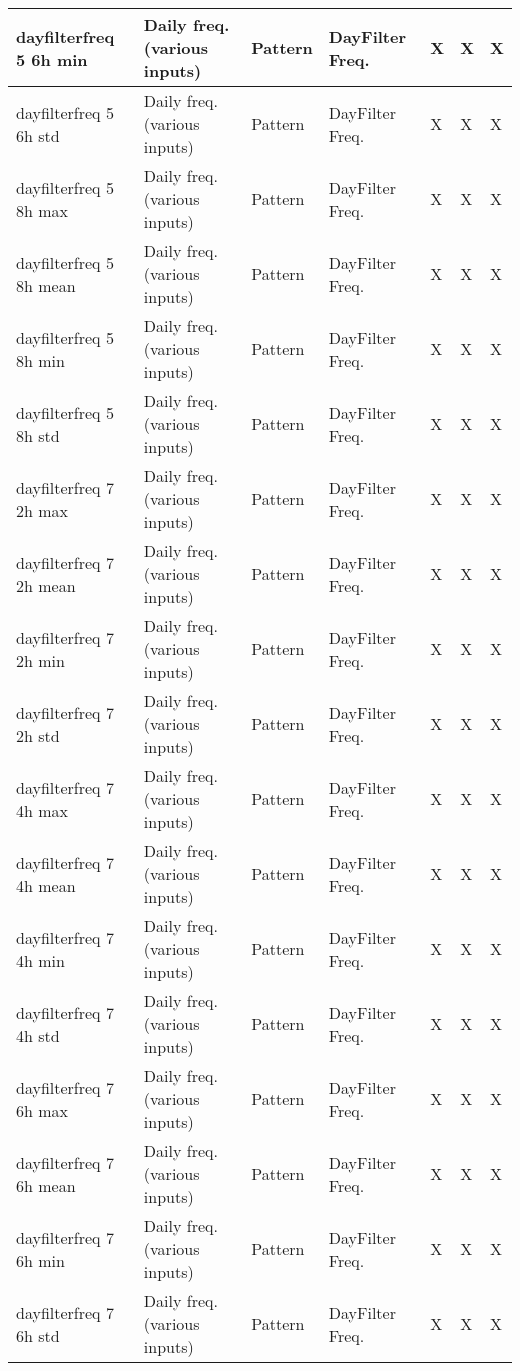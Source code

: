 {{\begin{longtable}[l]{ | p{4cm} | p{4cm} | p{1cm} | p{2cm} | p{0.3cm} | p{0.3cm} | p{0.3cm} |}
	 dayfilterfreq 5 6h min & Daily freq. (various inputs) & Pattern & DayFilter Freq. & X & X & X \\ \hline
	 dayfilterfreq 5 6h std & Daily freq. (various inputs) & Pattern & DayFilter Freq. & X & X & X \\ \hline
	 dayfilterfreq 5 8h max & Daily freq. (various inputs) & Pattern & DayFilter Freq. & X & X & X \\ \hline
	 dayfilterfreq 5 8h mean & Daily freq. (various inputs) & Pattern & DayFilter Freq. & X & X & X \\ \hline
	 dayfilterfreq 5 8h min & Daily freq. (various inputs) & Pattern & DayFilter Freq. & X & X & X \\ \hline
	 dayfilterfreq 5 8h std & Daily freq. (various inputs) & Pattern & DayFilter Freq. & X & X & X \\ \hline
	 dayfilterfreq 7 2h max & Daily freq. (various inputs) & Pattern & DayFilter Freq. & X & X & X \\ \hline
	 dayfilterfreq 7 2h mean & Daily freq. (various inputs) & Pattern & DayFilter Freq. & X & X & X \\ \hline
	 dayfilterfreq 7 2h min & Daily freq. (various inputs) & Pattern & DayFilter Freq. & X & X & X \\ \hline
	 dayfilterfreq 7 2h std & Daily freq. (various inputs) & Pattern & DayFilter Freq. & X & X & X \\ \hline
	 dayfilterfreq 7 4h max & Daily freq. (various inputs) & Pattern & DayFilter Freq. & X & X & X \\ \hline
	 dayfilterfreq 7 4h mean & Daily freq. (various inputs) & Pattern & DayFilter Freq. & X & X & X \\ \hline
	 dayfilterfreq 7 4h min & Daily freq. (various inputs) & Pattern & DayFilter Freq. & X & X & X \\ \hline
	 dayfilterfreq 7 4h std & Daily freq. (various inputs) & Pattern & DayFilter Freq. & X & X & X \\ \hline
	 dayfilterfreq 7 6h max & Daily freq. (various inputs) & Pattern & DayFilter Freq. & X & X & X \\ \hline
	 dayfilterfreq 7 6h mean & Daily freq. (various inputs) & Pattern & DayFilter Freq. & X & X & X \\ \hline
	 dayfilterfreq 7 6h min & Daily freq. (various inputs) & Pattern & DayFilter Freq. & X & X & X \\ \hline
	 dayfilterfreq 7 6h std & Daily freq. (various inputs) & Pattern & DayFilter Freq. & X & X & X \\ \hline

\end{longtable}}}
